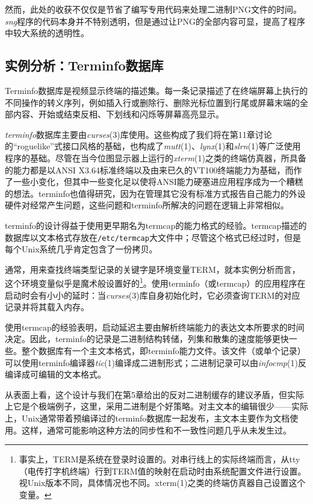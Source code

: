 \documentclass[12pt,oneside]{book}
\begin{document}
然而，此处的收获不仅仅是节省了编写专用代码来处理二进制PNG文件的时间。\textit{sng}程序的代码本身并不特别透明，但是通过让PNG的全部内容可显，提高了程序中较大系统的透明性。


\subsection{实例分析：Terminfo数据库}
Terminfo数据库是视频显示终端的描述集。每一条记录描述了在终端屏幕上执行的不同操作的转义序列，例如插入行或删除行、删除光标位置到行尾或屏幕末端的全部内容、开始或结束反相、下划线和闪烁等屏幕高亮显示。

\textit{terminfo}数据库主要由\textit{curses}(3)库使用。这些构成了我们将在第11章讨论的“roguelike”式接口风格的基础，也构成了\textit{mutt}(1)、\textit{lynx}(1)和\textit{slrn}(1)等广泛使用程序的基础。尽管在当今位图显示器上运行的\textit{xterm}(1)之类的终端仿真器，所具备的能力都是以ANSI X3.64标准终端以及由来已久的VT100终端能力为基础，而作了一些小变化，但其中一些变化足以使将ANSI能力硬塞进应用程序成为一个糟糕的想法。terminfo也值得研究，因为在管理其它没有标准方式报告自己能力的外设硬件对经常产生问题，这些问题和terminfo所解决的问题在逻辑上非常相似。

terminfo的设计得益于使用更早期名为termcap的能力格式的经验。termcap描述的数据库以文本格式存放在\verb+/etc/termcap+大文件中；尽管这个格式已经过时，但是每个Unix系统几乎肯定包含了一份拷贝。

通常，用来查找终端类型记录的关键字是环境变量TERM，就本实例分析而言，这个环境变量似乎是魔术般设置好的\footnote{事实上，TERM是系统在登录时设置的。对串行线上的实际终端而言，从tty（电传打字机终端）行到TERM值的映射在启动时由系统配置文件进行设置。视Unix版本不同，具体情况也不同。xterm(1)之类的终端仿真器自己设置这个变量。}。使用terminfo（或termcap）的应用程序在启动时会有小小的延时：当\textit{curses}(3)库自身初始化时，它必须查询TERM的对应记录并将其载入内存。

使用termcap的经验表明，启动延迟主要由解析终端能力的表达文本所要求的时间决定。因此，terminfo的记录是二进制结构转储，列集和散集的速度能够更快一些。整个数据库有一个主文本格式，即terminfo能力文件。该文件（或单个记录）可以使用terminfo编译器\textit{tic}(1)编译成二进制形式；二进制记录可以由\textit{infocmp}(1)反编译成可编辑的文本格式。

从表面上看，这个设计与我们在第5章给出的反对二进制缓存的建议矛盾，但实际上它是个极端例子，这里，采用二进制是个好策略。对主文本的编辑很少——实际上，Unix通常带着预编译过的terminfo数据库一起发布，主文本主要作为文档使用。这样，通常可能影响这种方法的同步性和不一致性问题几乎从未发生过。
\end{document}
